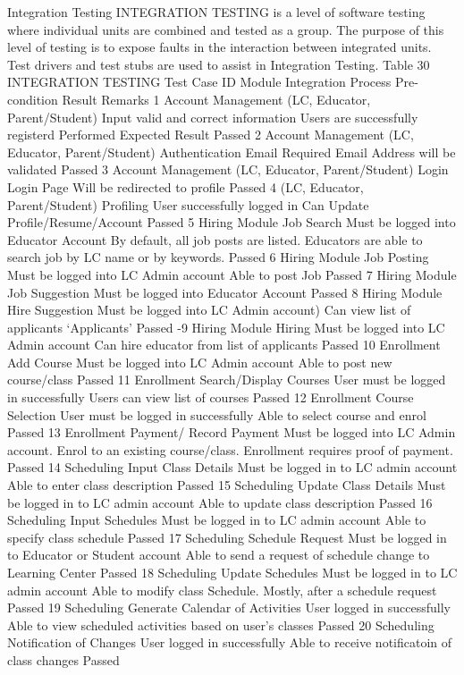 Integration Testing
	INTEGRATION TESTING is a level of software testing where individual units are combined and tested as a group. The purpose of this level of testing is to expose faults in the interaction between integrated units. Test drivers and test stubs are used to assist in Integration Testing.
Table 30
INTEGRATION TESTING
Test Case ID	Module	Integration Process	Pre-condition	Result	Remarks
1	Account Management (LC, Educator, Parent/Student)	Input valid and correct information	Users are successfully registerd	Performed Expected Result	Passed
2	Account Management (LC, Educator, Parent/Student)	Authentication	Email Required	Email Address will be validated	Passed
3	Account Management (LC, Educator, Parent/Student)	Login	Login Page	Will be redirected to profile	Passed
4	(LC, Educator, Parent/Student)	Profiling	User successfully logged in	Can Update Profile/Resume/Account	Passed
5	Hiring Module	Job Search	Must be logged into Educator Account 	By default, all job posts are listed. Educators are able to search job by LC name or by keywords.
	Passed
6	Hiring Module	Job Posting	Must be logged into LC Admin account 	Able to post Job 	Passed
7	Hiring Module	Job Suggestion	Must be logged into Educator Account 		Passed
8	Hiring Module	Hire Suggestion	Must be logged into LC Admin account)	Can view list of applicants ‘Applicants’	Passed
-9	Hiring Module	Hiring	Must be logged into LC Admin account	Can hire educator from list of applicants	Passed
10	Enrollment	Add Course	Must be logged into LC Admin account	Able to post new course/class	Passed
11	Enrollment	Search/Display Courses	User must be logged in successfully	Users can view list of courses	Passed
12	Enrollment	Course Selection	User must be logged in successfully	Able to select course and enrol	Passed
13	Enrollment	Payment/ Record Payment	Must be logged into LC Admin account. Enrol to an existing course/class.	Enrollment requires proof of payment. 	Passed
14	Scheduling	Input Class Details	Must be logged in to LC admin account	Able to enter class description	Passed
15	Scheduling	Update Class Details	Must be logged in to LC admin account	Able to update class description	Passed
16	Scheduling	Input Schedules	Must be logged in to LC admin account	Able to specify class schedule	Passed
17	Scheduling	Schedule Request	Must be logged in to Educator or Student account	Able to send a request of schedule change to Learning Center	Passed
18	Scheduling	Update Schedules	Must be logged in to LC admin account	Able to modify class Schedule. Mostly, after a schedule request	Passed
19	Scheduling	Generate Calendar of Activities	User logged in successfully	Able to view scheduled activities based on user’s classes	Passed
20	Scheduling	Notification of Changes	User logged in successfully	Able to receive notificatoin of class changes	Passed



















